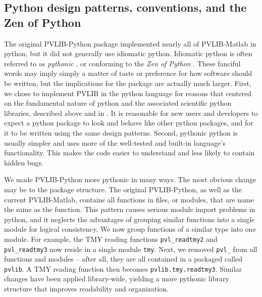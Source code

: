 \documentclass[conference]{IEEEtran}
\newcommand{\holmgren}[1]{{\bf\color{red} WH: #1}}
\begin{document}
\subsection{Python design patterns, conventions, and the Zen of Python}

The original PVLIB-Python package implemented nearly all of PVLIB-Matlab in python, but it did not generally use idiomatic python.
Idiomatic python is often referred to as \emph{pythonic} \cite{pythonic}, or conforming to the \emph{Zen of Python} \cite{zenofpython}. 
These fanciful words may imply simply a matter of taste or preference for how software should be written, but the implications for the package are actually much larger.
First, we chose to implement PVLIB in the python language for reasons that centered on the fundamental nature of python and the associated scientific python libraries, described above and in \cite{andrews}. 
It is reasonable for new users and developers to expect a python package to look and behave like other python packages, and for it to be written using the same design patterns.
Second, pythonic python is usually simpler and uses more of the well-tested and built-in language's functionality.
This makes the code easier to understand and less likely to contain hidden bugs. 

We made PVLIB-Python more pythonic in many ways. 
The most obvious change may be to the package structure. 
The original PVLIB-Python, as well as the current PVLIB-Matlab, contains all functions in files, or modules, that are name the same as the function. 
This pattern causes serious module import problems in python, and it neglects the advantages of grouping similar functions into a single module for logical consistency.
We now group functions of a similar type into one module. 
For example, the TMY reading functions \texttt{pvl{\_}readtmy2} and \texttt{pvl{\_}readtmy3} now reside in a single module \texttt{tmy}. 
Next, we removed \texttt{pvl{\_}} from all functions and modules -- after all, they are all contained in a packaged called \texttt{pvlib}. 
A TMY reading function then becomes \texttt{pvlib.tmy.readtmy3}. 
Similar changes have been applied library-wide, yielding a more pythonic library structure that improves readability and organization. 
\end{document}
